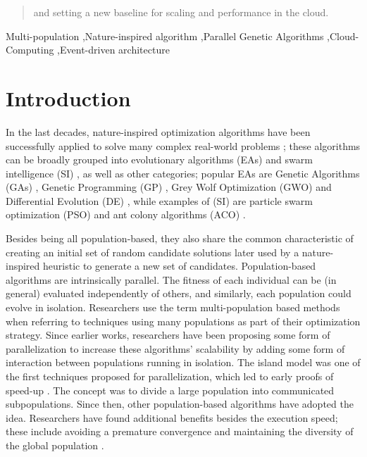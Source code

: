 \documentclass[review]{elsarticle}
\begin{document}
\begin{frontmatter}
\begin{abstract}
and setting a new baseline for scaling and
performance in the cloud.
\end{abstract}

\begin{keyword}
Multi-population \sep Nature-inspired algorithm \sep Parallel Genetic Algorithms \sep Cloud-Computing
\sep Event-driven architecture 
\end{keyword}

\end{frontmatter}

\linenumbers

\section{Introduction}

In the last decades, nature-inspired optimization algorithms have been successfully
applied to solve many complex real-world problems
\cite{yang2014nature}; these algorithms can be broadly grouped into evolutionary algorithms (EAs)
\cite{back1996evolutionary} and swarm intelligence (SI)
\cite{kennedy2006swarm}, as well as other categories; popular EAs
are Genetic Algorithms (GAs) \cite{holland1992adaptation,eiben2003genetic}, 
Genetic Programming (GP) \cite{back1996evolutionary}, Grey Wolf Optimization
(GWO) \cite{mirjalili2014grey} and Differential Evolution (DE) \cite{karabouga2004simple},
while examples of (SI) \cite{kennedy2006swarm} are particle swarm
optimization (PSO) \cite{clerc2010particle} and ant colony algorithms (ACO) \cite{dorigo1999ant}.

Besides being all population-based, they also share the common characteristic of 
creating an initial set of random candidate solutions later used by a 
nature-inspired heuristic to generate a new set of candidates. 
Population-based algorithms are intrinsically parallel.
The fitness of each individual can be (in general) evaluated independently of 
others, and similarly, each population could evolve in isolation. Researchers use the term
multi-population based methods when referring to techniques using
many populations as part of their optimization strategy. 
Since earlier works, researchers have been proposing some form of parallelization
\cite{muhlenbein1988evolution} to increase these algorithms' scalability
by adding some form of interaction between populations running in isolation.
The island model was one of the first techniques proposed for parallelization,
which led to early proofs of speed-up \cite{gorges1990explicit,grosso1985computer}. 
The concept was to divide a large population into communicated subpopulations. 
Since then, other population-based algorithms have adopted the idea. 
Researchers have found additional benefits
besides the execution speed; these include avoiding a premature convergence and
maintaining the diversity of the global population \cite{li2015multi}. 
\end{document}
